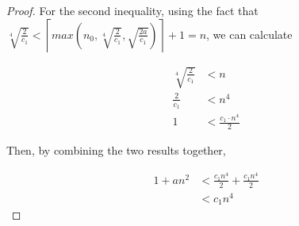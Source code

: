 \documentclass[12pt]{article}
\begin{document}
\begin{itemize}
\begin{proof}
    \bigskip

    For the second inequality, using the fact that $\sqrt[4]{\frac{2}{c_1}} <
    \left\lceil max(n_0, \sqrt[4]{\frac{2}{c_1}},\sqrt{\frac{2a}{c_1}}) \right\rceil + 1 = n$,
    we can calculate

    \begin{align}
        \sqrt[4]{\frac{2}{c_1}} &< n\\
        \frac{2}{c_1} &< n^4\\
        1 &< \frac{c_1 \cdot n^4}{2}
    \end{align}

    \bigskip

    Then, by combining the two results together,

    \begin{align}
        1 + an^2 &< \frac{c_1n^4}{2} + \frac{c_1n^4}{2}\\
        &< c_1n^4
    \end{align}

    \end{proof}

\end{itemize}
\end{document}
